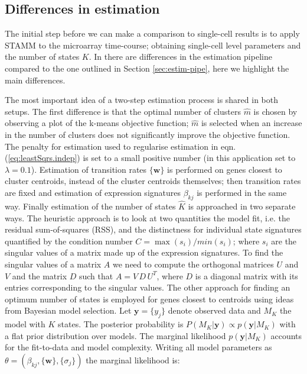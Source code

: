 \subsection{Differences in estimation}
\label{sec:diff-estim}

The initial step before we can make a comparison to single-cell results is to apply STAMM to the microarray time-course; obtaining single-cell level parameters and the number of states $K$. In  \cite{Armond:2013} there are differences in the estimation pipeline compared to the one outlined in Section \ref{sec:estim-pipe}, here we highlight the main differences.

The most important idea of a two-step estimation process is shared in both setups. The first difference is that the optimal number of clusters $\hat{m}$ is chosen by observing a plot of the k-means objective function; $\hat{m}$ is selected when an increase in the number of clusters does not significantly improve the objective function. The penalty for estimation used to regularise estimation in eqn. (\ref{eq:leastSqrs.indep}) is set to a small positive number (in this application set to $ \lambda = 0.1 $). Estimation of transition rates $\lbrace \mathbf{w} \rbrace $ is performed on genes closest to cluster centroids, instead of the cluster centroids themselves; then transition rates are fixed and estimation of expression signatures $\beta_{kj}$ is performed in the same way. Finally estimation of the number of states $\hat{K}$ is approached in two separate ways. The heuristic approach is to look at two quantities the model fit, i.e. the residual sum-of-squares (RSS), and the distinctness for individual state signatures quantified by the condition number $C = \max(s_i) / min(s_i)$; where $s_i$ are the singular values of a matrix made up of the expression signatures. To find the singular values of a matrix $A$ we need to compute the orthogonal matrices $U$ and $V$ and the matrix $D$ such that $A = V\, D \, U^T$, where $D$ is a diagonal matrix with its entries corresponding to the singular values. The other approach for finding an optimum number of states is employed for genes closest to centroids using ideas from Bayesian model selection. Let $\mathbf{y} = \lbrace y_j \rbrace$ denote observed data and $M_K$ the model with $K$ states. The posterior probability is $P(M_K | \mathbf{y}) \propto p(\mathbf{y}|M_K) $ with a flat prior distribution over models. The marginal likelihood $p(\mathbf{y} | M_K)$ accounts for the fit-to-data and model complexity. Writing all model parameters as $\theta = (\beta_{kj}, \lbrace \mathbf{w} \rbrace, \lbrace \sigma_j \rbrace) $ the marginal likelihood is:

